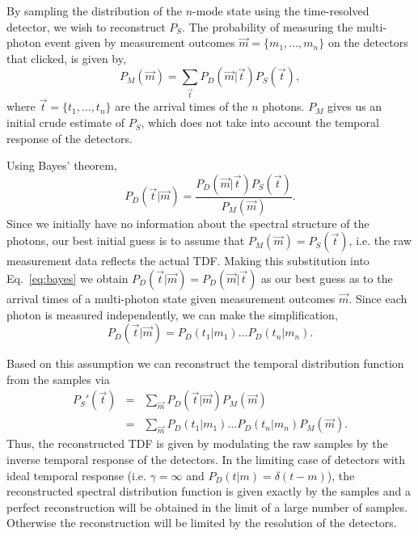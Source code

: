 \documentclass[aps,pra,twocolumn,amsmath,amssymb,color,superscriptaddress]{revtex4}
\begin{document}
By sampling the distribution of the $n$-mode state using the time-resolved detector, we wish to reconstruct $P_S$. The probability of measuring the multi-photon event given by measurement outcomes \mbox{$\vec{m}=\{m_1,\dots,m_n\}$} on the detectors that clicked, is given by,
\begin{equation} \label{eq:mProb}
P_M(\vec{m}) = \sum_{\vec{t}} P_{D}(\vec{m}|\vec{t}) P_{S}(\vec{t}),
\end{equation}
where \mbox{$\vec{t}=\{t_1,\dots,t_n\}$} are the arrival times of the $n$ photons. $P_M$ gives us an initial crude estimate of $P_S$, which does not take into account the temporal response of the detectors.

Using Bayes' theorem,
\begin{equation} \label{eq:bayes}
P_D(\vec{t}|\vec{m}) = \frac{P_D(\vec{m}|\vec{t})P_S(\vec{t})}{P_M(\vec{m})}.
\end{equation}
Since we initially have no information about the spectral structure of the photons, our best initial guess is to assume that $P_M(\vec{m})=P_S(\vec{t})$, i.e. the raw measurement data reflects the actual TDF. Making this substitution into Eq.~\ref{eq:bayes} we obtain \mbox{$P_{D}(\vec{t}|\vec{m}) = P_{D}(\vec{m}|\vec{t})$} as our best guess as to the arrival times of a multi-photon state given measurement outcomes $\vec{m}$. Since each photon is measured independently, we can make the simplification,
\begin{equation}
P_{D}(\vec{t}|\vec{m})=P_{D}(t_{1}|m_{1})\dots P_{D}(t_{n}|m_{n}).
\end{equation}

Based on this assumption we can reconstruct the temporal distribution function from the samples via
\begin{eqnarray} \label{eq:reconstr}
P_{S}'(\vec{t}) &=& \sum_{\vec{m}} P_{D}(\vec{t}|\vec{m})P_M(\vec{m}) \nonumber \\
&=& \sum_{\vec{m}} P_{D}(t_{1}|m_{1})\dots P_{D}(t_{n}|m_{n}) P_M(\vec{m}).
\end{eqnarray}
Thus, the reconstructed TDF is given by modulating the raw samples by the inverse temporal response of the detectors. In the limiting case of detectors with ideal temporal response (i.e. \mbox{$\gamma=\infty$} and \mbox{$P_D(t|m)=\delta(t-m)$}), the reconstructed spectral distribution function is given exactly by the samples and a perfect reconstruction will be obtained in the limit of a large number of samples. Otherwise the reconstruction will be limited by the resolution of the detectors.
\end{document}
